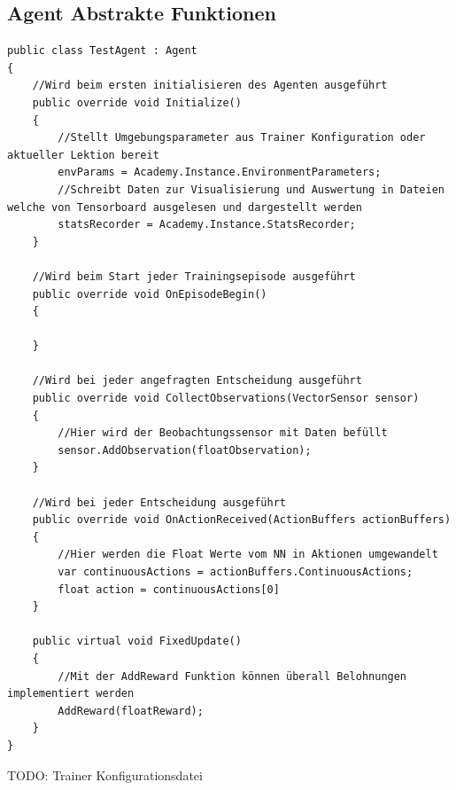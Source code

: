 \subsection{Agent Abstrakte Funktionen}
\begin{lstlisting}
public class TestAgent : Agent
{
    //Wird beim ersten initialisieren des Agenten ausgeführt
    public override void Initialize()
    {
        //Stellt Umgebungsparameter aus Trainer Konfiguration oder aktueller Lektion bereit
        envParams = Academy.Instance.EnvironmentParameters;
        //Schreibt Daten zur Visualisierung und Auswertung in Dateien welche von Tensorboard ausgelesen und dargestellt werden
        statsRecorder = Academy.Instance.StatsRecorder;
    }

    //Wird beim Start jeder Trainingsepisode ausgeführt
    public override void OnEpisodeBegin()
    {
    
    }

    //Wird bei jeder angefragten Entscheidung ausgeführt
    public override void CollectObservations(VectorSensor sensor)
    {
        //Hier wird der Beobachtungssensor mit Daten befüllt
        sensor.AddObservation(floatObservation);
    }

    //Wird bei jeder Entscheidung ausgeführt
    public override void OnActionReceived(ActionBuffers actionBuffers)
    {
        //Hier werden die Float Werte vom NN in Aktionen umgewandelt
        var continuousActions = actionBuffers.ContinuousActions;
        float action = continuousActions[0]
    }

    public virtual void FixedUpdate()
    {
        //Mit der AddReward Funktion können überall Belohnungen implementiert werden
        AddReward(floatReward);
    }
}

\end{lstlisting}

TODO:
Trainer Konfigurationsdatei
